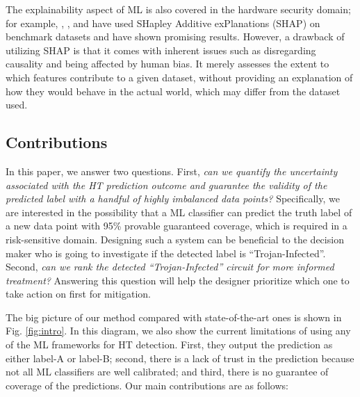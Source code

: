 \documentclass[9pt,conference]{IEEEtran}
\begin{document}
The explainability aspect of ML is also covered in the hardware security domain; for example, \cite{pan2023hardware}, \cite{downing2021deepreflect}, and \cite{severi2021explanation} have used SHapley Additive exPlanations (SHAP) on benchmark datasets and have shown promising results. However, a drawback of utilizing SHAP is that it comes with inherent issues such as disregarding causality and being affected by human bias. It merely assesses the extent to which features contribute to a given dataset, without providing an explanation of how they would behave in the actual world, which may differ from the dataset used.

\subsection{Contributions}
\label{Contribution}
In this paper, we answer two questions. First, \textit{can we quantify the uncertainty associated with the HT prediction outcome and guarantee the validity of the predicted label with a handful of highly imbalanced data points? } Specifically, we are interested in the possibility that a ML classifier can predict the truth label of a new data point with 95\% provable guaranteed coverage, which is required in a risk-sensitive domain. Designing such a system can be beneficial to the decision maker who is going to investigate if the detected label is ``Trojan-Infected''. Second, \textit{can we rank the detected ``Trojan-Infected'' circuit for more informed treatment?} Answering this question will help the designer prioritize which one to take action on first for mitigation.

The big picture of our method compared with state-of-the-art ones is shown in Fig. \ref{fig:intro}. In this diagram, we also show the current limitations of using any of the ML frameworks for HT detection. First, they output the prediction as either label-A or label-B; second, there is a lack of trust in the prediction because not all ML classifiers are well calibrated; and third, there is no guarantee of coverage of the predictions. Our main contributions are as follows:
\end{document}
